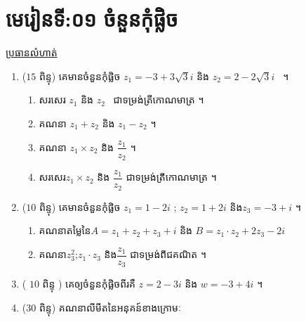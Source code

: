 \documentclass[a4paper, 12pt]{article}
\begin{document}
\section*{\color{blue}មេរៀនទី:០១​ \centering ចំនួនកុំផ្លិច }
\begin{description}
	\item[\underline{ប្រធានលំហាត់}]
\end{description}
	\begin{enumerate}
		\item ($ 15 $ ពិន្ទុ) គេមានចំនួនកុំផ្លិច $ z_{1}=-3+3\sqrt{3}i $ និង $ z_{2}=2-2\sqrt{3}i $~ ។​
		\begin{multicols}{2}
			\begin{enumerate}
				\item សរសេរ $ z_{1} $ និង $ z_{2} $​~ ជាទម្រង់ត្រីកោណមាត្រ ។ 
				\item គណនា $ z_{1} +z_{2} $ និង $ z_{1}-z_{2} $ ។ 
				\item គណនា $ z_{1}\times z_{2} $ និង $ \dfrac{z_{1}}{z_{2}} $ ។
				\item សរសេរ​ $ z_{1}\times z_{2} $ និង $ \dfrac{z_{1}}{z_{2}} $ ជាទម្រង់ត្រីកោណមាត្រ ។
				\end{enumerate}
		\end{multicols}
	\item​ ($ 10 $ ពិន្ទុ) គេមានចំនួនកុំផ្លិច $ z_{1}=1-2i $ ; $ z_{2}=1+2i $ និង​ $ z_{3}=-3+i $ ។
		\begin{enumerate}
			\item គណនាតម្លៃនៃ​ $ A=z_{1}+ z_{2}+z_{3}+i$ និង $ B=z_{1}\cdot z_{2}+2 z_{3}-2i $
			\item គណនា​ $ z_{3}^2 $\quad ;\quad  $ z_{1}\cdot z_{3} $ \quad និង​ $ \dfrac{z_{1}}{z_{3}} $ ជាទម្រង់ពីជគណិត ។
		\end{enumerate}
	\item ( $ 10 $ ពិន្ទុ ) គេឲ្យចំនួនកុំផ្លិចពីរគឺ $ z=2-3i $ និង $ w=-3+4i $ ។
		\begin{enumerate}
		\end{enumerate}
	\item ($30$ ពិន្ទុ) គណនាលីមីតនៃអនុគន៍ខាងក្រោមៈ
	\begin{enumerate}

\end{enumerate}
\end{enumerate}
\end{document}
